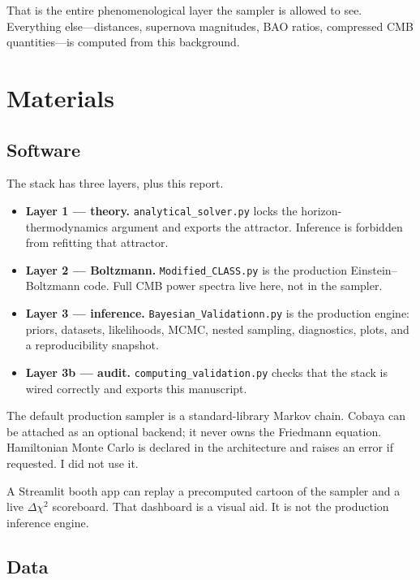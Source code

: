 \documentclass[12pt,letterpaper]{article}
\begin{document}
That is the entire phenomenological layer the sampler is allowed to
see. Everything else---distances, supernova magnitudes, BAO ratios,
compressed CMB quantities---is computed from this background.

\section{Materials}

\subsection{Software}

The stack has three layers, plus this report.

\begin{itemize}[leftmargin=1.6em]
  \item \textbf{Layer 1 --- theory.} \texttt{analytical\_solver.py}
        locks the horizon-thermodynamics argument and exports the
        attractor. Inference is forbidden from refitting that attractor.
  \item \textbf{Layer 2 --- Boltzmann.} \texttt{Modified\_CLASS.py}
        is the production Einstein--Boltzmann code. Full CMB power
        spectra live here, not in the sampler.
  \item \textbf{Layer 3 --- inference.} \texttt{Bayesian\_Validationn.py}
        is the production engine: priors, datasets, likelihoods, MCMC,
        nested sampling, diagnostics, plots, and a reproducibility
        snapshot.
  \item \textbf{Layer 3b --- audit.} \texttt{computing\_validation.py}
        checks that the stack is wired correctly and exports this
        manuscript.
\end{itemize}

The default production sampler is a standard-library Markov chain.
Cobaya can be attached as an optional backend; it never owns the
Friedmann equation. Hamiltonian Monte Carlo is declared in the
architecture and raises an error if requested. I did not use it.

A Streamlit booth app can replay a precomputed cartoon of the sampler
and a live $\Delta\chi^2$ scoreboard. That dashboard is a visual aid.
It is not the production inference engine.

\subsection{Data}
\end{document}
